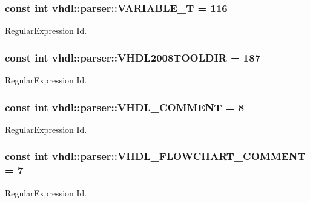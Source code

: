 \subsubsection[{V\+A\+R\+I\+A\+B\+L\+E\+\_\+\+T}]{\setlength{\rightskip}{0pt plus 5cm}const int vhdl\+::parser\+::\+V\+A\+R\+I\+A\+B\+L\+E\+\_\+\+T = 116}\label{namespacevhdl_1_1parser_aaeb31d756ecb51f6481da6f3f91d6f6e}
Regular\+Expression Id. \hypertarget{namespacevhdl_1_1parser_ae16a562f5a00a3807544d7257a32a87b}{}
\subsubsection[{V\+H\+D\+L2008\+T\+O\+O\+L\+D\+I\+R}]{\setlength{\rightskip}{0pt plus 5cm}const int vhdl\+::parser\+::\+V\+H\+D\+L2008\+T\+O\+O\+L\+D\+I\+R = 187}\label{namespacevhdl_1_1parser_ae16a562f5a00a3807544d7257a32a87b}
Regular\+Expression Id. \hypertarget{namespacevhdl_1_1parser_a326b09334a7d8deedb665dd26090bffe}{}
\subsubsection[{V\+H\+D\+L\+\_\+\+C\+O\+M\+M\+E\+N\+T}]{\setlength{\rightskip}{0pt plus 5cm}const int vhdl\+::parser\+::\+V\+H\+D\+L\+\_\+\+C\+O\+M\+M\+E\+N\+T = 8}\label{namespacevhdl_1_1parser_a326b09334a7d8deedb665dd26090bffe}
Regular\+Expression Id. \hypertarget{namespacevhdl_1_1parser_a477905847fb4d2e3aab22091506e7041}{}
\subsubsection[{V\+H\+D\+L\+\_\+\+F\+L\+O\+W\+C\+H\+A\+R\+T\+\_\+\+C\+O\+M\+M\+E\+N\+T}]{\setlength{\rightskip}{0pt plus 5cm}const int vhdl\+::parser\+::\+V\+H\+D\+L\+\_\+\+F\+L\+O\+W\+C\+H\+A\+R\+T\+\_\+\+C\+O\+M\+M\+E\+N\+T = 7}\label{namespacevhdl_1_1parser_a477905847fb4d2e3aab22091506e7041}
Regular\+Expression Id. \hypertarget{namespacevhdl_1_1parser_a3994f768ead2ca3502858fb9cbd34195}{}
